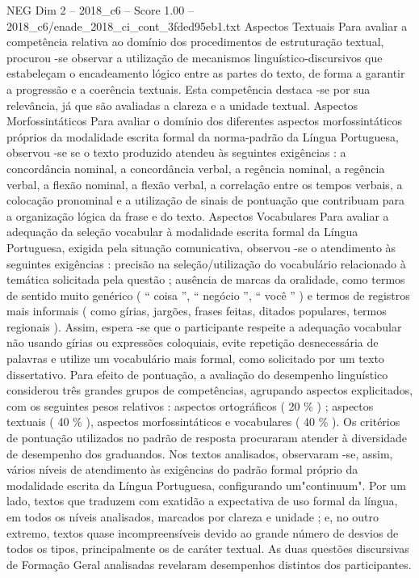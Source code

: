 \begin{textsample}{NEG Dim 2 – 2018\_c6 – Score 1.00 – 2018\_c6/enade\_2018\_ci\_cont\_3fded95eb1.txt}
Aspectos Textuais Para avaliar a competência relativa ao domínio dos procedimentos de estruturação textual, procurou -se observar a utilização de mecanismos linguístico-discursivos que estabeleçam o encadeamento lógico entre as partes do texto, de forma a garantir a progressão e a coerência textuais.
Esta competência destaca -se por sua relevância, já que são avaliadas a clareza e a unidade textual.
Aspectos Morfossintáticos Para avaliar o domínio dos diferentes aspectos morfossintáticos próprios da modalidade escrita formal da norma-padrão da Língua Portuguesa, observou -se se o texto produzido atendeu às seguintes exigências : a concordância nominal, a concordância verbal, a regência nominal, a regência verbal, a flexão nominal, a flexão verbal, a correlação entre os tempos verbais, a colocação pronominal e a utilização de sinais de pontuação que contribuam para a organização lógica da frase e do texto.
Aspectos Vocabulares Para avaliar a adequação da seleção vocabular à modalidade escrita formal da Língua Portuguesa, exigida pela situação comunicativa, observou -se o atendimento às seguintes exigências : precisão na seleção/utilização do vocabulário relacionado à temática solicitada pela questão ; ausência de marcas da oralidade, como termos de sentido muito genérico ( “ coisa ”, “ negócio ”, “ você ” ) e termos de registros mais informais ( como gírias, jargões, frases feitas, ditados populares, termos regionais ).
Assim, espera -se que o participante respeite a adequação vocabular não usando gírias ou expressões coloquiais, evite repetição desnecessária de palavras e utilize um vocabulário mais formal, como solicitado por um texto dissertativo.
Para efeito de pontuação, a avaliação do desempenho linguístico considerou três grandes grupos de competências, agrupando aspectos explicitados, com os seguintes pesos relativos : aspectos ortográficos ( 20 \% ) ; aspectos textuais ( 40 \% ), aspectos morfossintáticos e vocabulares ( 40 \% ).
Os critérios de pontuação utilizados no padrão de resposta procuraram atender à diversidade de desempenho dos graduandos.
Nos textos analisados, observaram -se, assim, vários níveis de atendimento às exigências do padrão formal próprio da modalidade escrita da Língua Portuguesa, configurando um"continuum".
Por um lado, textos que traduzem com exatidão a expectativa de uso formal da língua, em todos os níveis analisados, marcados por clareza e unidade ; e, no outro extremo, textos quase incompreensíveis devido ao grande número de desvios de todos os tipos, principalmente os de caráter textual.
As duas questões discursivas de Formação Geral analisadas revelaram desempenhos distintos dos participantes.

\end{textsample}
